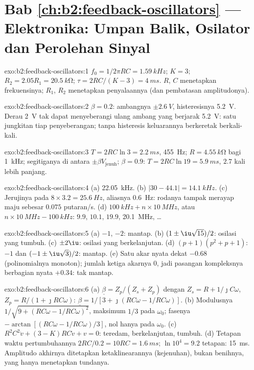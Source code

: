 \section*{Bab \ref{ch:b2:feedback-oscillators} --- Elektronika: Umpan Balik, Osilator dan Perolehan Sinyal}

\begin{solution}{exo:b2:feedback-oscillators:1}
$f_0 = 1/2\pi RC = \qty{1.59}{kHz}$; $K = 3$; $R_2 = 2.05R_1 = \qty{20.5}{k\ohm}$;
$\tau = 2RC/(K - 3) = \qty{4}{ms}$. $R$, $C$ menetapkan frekuensinya; $R_1$, $R_2$ menetapkan
penyalaannya (dan pembatasan amplitudonya).
\end{solution}

\begin{solution}{exo:b2:feedback-oscillators:2}
$\beta = 0.2$: ambangnya $\pm\qty{2.6}{V}$, histeresisnya \qty{5.2}{V}. Derau
\qty{2}{V} tak dapat menyeberangi ulang ambang yang berjarak \qty{5.2}{V}: satu jungkitan tiap
penyeberangan; tanpa histeresis keluarannya berkeretak berkali-kali.
\end{solution}

\begin{solution}{exo:b2:feedback-oscillators:3}
$T = 2RC\ln3 = \qty{2.2}{ms}$, \qty{455}{Hz}; $R = \qty{4.55}{k\ohm}$ bagi \qty{1}{kHz};
segitiganya di antara $\pm\beta V_{\text{jenuh}}$; $\beta = 0.9$: $T = 2RC\ln19 = \qty{5.9}{ms}$,
$2.7$ kali lebih panjang.
\end{solution}

\begin{solution}{exo:b2:feedback-oscillators:4}
(a) \qty{22.05}{kHz}. (b) $|30 - 44.1| = \qty{14.1}{kHz}$. (c) Jerujinya pada $8 \times 3.2 =
\qty{25.6}{Hz}$, aliasnya \qty{0.6}{Hz}: rodanya tampak merayap maju sebesar
$0.075$ putaran/s. (d) $\qty{100}{kHz} + n \times \qty{10}{MHz}$, atau $n \times \qty{10}{MHz} -
\qty{100}{kHz}$: $9.9$, $10.1$, $19.9$, \qty{20.1}{MHz}, \dots
\end{solution}

\begin{solution}{exo:b2:feedback-oscillators:5}
(a) $-1$, $-2$: mantap. (b) $(1 \pm \iu\sqrt{15})/2$: osilasi yang tumbuh.
(c) $\pm2\iu$: osilasi yang berkelanjutan. (d) $(p + 1)(p^2 + p + 1)$: $-1$ dan
$(-1 \pm \iu\sqrt3)/2$: mantap. (e) Satu akar nyata dekat $-0.68$ (polinomialnya
monoton); jumlah ketiga akarnya $0$, jadi
pasangan kompleksnya berbagian nyata $+0.34$: tak mantap.
\end{solution}

\begin{solution}{exo:b2:feedback-oscillators:6}
(a) $\underline\beta = Z_p/(Z_s + Z_p)$ dengan $Z_s = R + 1/\jmath C\omega$, $Z_p = R/(1 +
\jmath RC\omega)$: $\underline\beta = 1/[3 + \jmath(RC\omega - 1/RC\omega)]$. (b) Modulusnya
$1/\sqrt{9 + (RC\omega - 1/RC\omega)^2}$, maksimum $1/3$ pada $\omega_0$; fasenya $-\arctan
[(RC\omega - 1/RC\omega)/3]$, nol hanya pada $\omega_0$. (c) $R^2C^2\ddot v + (3 - K)RC
\dot v + v = 0$: teredam, berkelanjutan, tumbuh. (d) Tetapan waktu pertumbuhannya
$2RC/0.2 = 10RC = \qty{1.6}{ms}$; $\ln10^4 = 9.2$ tetapan: \qty{15}{ms}.
Amplitudo akhirnya ditetapkan ketaklinearannya (kejenuhan), bukan
benihnya, yang hanya menetapkan tundanya.
\end{solution}

